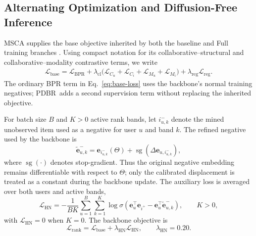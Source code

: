 \documentclass[sigconf,anonymous,review]{acmart}
\newcommand{\pdbr}{PDBR}
\newcommand{\sg}{\operatorname{sg}}
\begin{document}
\subsection{Alternating Optimization and Diffusion-Free Inference}
\label{sec:optimization}

MSCA supplies the base objective inherited by both the baseline and Full training branches \cite{li2026msca}.
Using compact notation for its collaborative--structural and collaborative--modality contrastive terms, we write
\begin{equation}
\begin{split}
    \mathcal{L}_{\mathrm{base}}
    =
    \mathcal{L}_{\mathrm{BPR}}
    +\lambda_{\mathrm{cl}}\big(
       \mathcal{L}_{C_u}+\mathcal{L}_{C_i}
       +\mathcal{L}_{M_u}+\mathcal{L}_{M_i}
    \big)
    +\lambda_{\mathrm{reg}}\mathcal{L}_{\mathrm{reg}}.
    \label{eq:base-loss}
\end{split}
\end{equation}
The ordinary BPR term in Eq.~\eqref{eq:base-loss} uses the backbone's normal training negatives; \pdbr\ adds a second supervision term without replacing the inherited objective.

For batch size $B$ and $K>0$ active rank bands, let $i^-_{u,k}$ denote the mined unobserved item used as a negative for user $u$ and band $k$.
The refined negative used by the backbone is
\begin{equation}
    \widetilde{\mathbf{e}}_{u,k}^{-}
    =
    \mathbf{e}_{i^-_{u,k}}(\Theta)
    +
    \sg\!\left(\Delta\mathbf{e}_{u,i^-_{u,k}}\right),
    \label{eq:stopgrad-refine}
\end{equation}
where $\sg(\cdot)$ denotes stop-gradient.
Thus the original negative embedding remains differentiable with respect to $\Theta$; only the calibrated displacement is treated as a constant during the backbone update.
The auxiliary loss is averaged over both users and active bands,
\begin{equation}
    \mathcal{L}_{\mathrm{HN}}
    =
    -\frac{1}{BK}
    \sum_{u=1}^{B}
    \sum_{k=1}^{K}
    \log\sigma\!\left(
      \mathbf{e}_u^{\top}\mathbf{e}_{i^+}
      -
      \mathbf{e}_u^{\top}\widetilde{\mathbf{e}}_{u,k}^{-}
    \right),
    \qquad K>0,
    \label{eq:auxbpr}
\end{equation}
with $\mathcal{L}_{\mathrm{HN}}=0$ when $K=0$.
The backbone objective is
\begin{equation}
    \mathcal{L}_{\mathrm{rank}}
    =
    \mathcal{L}_{\mathrm{base}}
    +
    \lambda_{\mathrm{HN}}\mathcal{L}_{\mathrm{HN}},
    \qquad
    \lambda_{\mathrm{HN}}=0.20.
    \label{eq:totalrank}
\end{equation}
\end{document}
